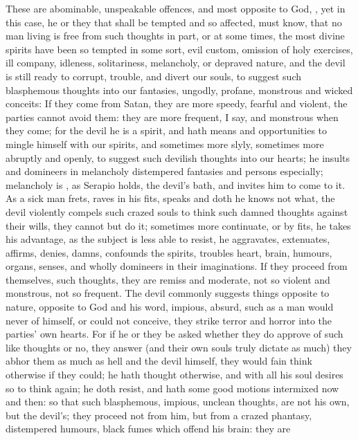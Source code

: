 {These are abominable, unspeakable offences, and most opposite to God,
, yet in this case, he or they that shall
be tempted and so affected, must know, that no man living is free from
such thoughts in part, or at some times, the most divine spirits have
been so tempted in some sort, evil custom, omission of holy exercises,
ill company, idleness, solitariness, melancholy, or depraved nature,
and the devil is still ready to corrupt, trouble, and divert our souls,
to suggest such blasphemous thoughts into our fantasies, ungodly,
profane, monstrous and wicked conceits: If they come from Satan, they
are more speedy, fearful and violent, the parties cannot avoid them:
they are more frequent, I say, and monstrous when they come; for the
devil he is a spirit, and hath means and opportunities to mingle
himself with our spirits, and sometimes more slyly, sometimes more
abruptly and openly, to suggest such devilish thoughts into our hearts;
he insults and domineers in melancholy distempered fantasies and
persons especially; melancholy is , as Serapio holds,
the devil's bath, and invites him to come to it. As a sick man frets,
raves in his fits, speaks and doth he knows not what, the devil
violently compels such crazed souls to think such damned thoughts
against their wills, they cannot but do it; sometimes more continuate,
or by fits, he takes his advantage, as the subject is less able to
resist, he aggravates, extenuates, affirms, denies, damns, confounds
the spirits, troubles heart, brain, humours, organs, senses, and wholly
domineers in their imaginations. If they proceed from themselves, such
thoughts, they are remiss and moderate, not so violent and monstrous,
not so frequent. The devil commonly suggests things opposite to nature,
opposite to God and his word, impious, absurd, such as a man would
never of himself, or could not conceive, they strike terror and horror
into the parties' own hearts. For if he or they be asked whether they
do approve of such like thoughts or no, they answer (and their own
souls truly dictate as much) they abhor them as much as hell and the
devil himself, they would fain think otherwise if they could; he hath
thought otherwise, and with all his soul desires so to think again; he
doth resist, and hath some good motions intermixed now and then: so
that such blasphemous, impious, unclean thoughts, are not his own, but
the devil's; they proceed not from him, but from a crazed phantasy,
distempered humours, black fumes which offend his brain: they are
}
